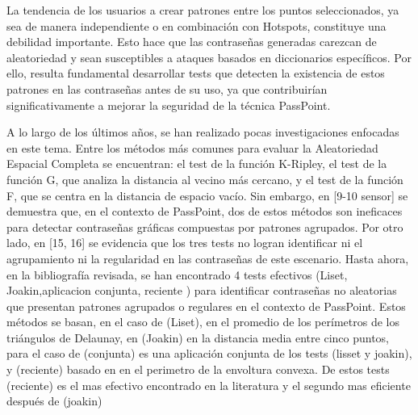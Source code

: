 \documentclass[12pt]{report}
\begin{document}
	La tendencia de los usuarios a crear patrones entre los puntos seleccionados, ya sea de manera independiente o en combinación con Hotspots, constituye una debilidad importante. Esto hace que las contraseñas generadas carezcan de aleatoriedad y sean susceptibles a ataques basados en diccionarios específicos. Por ello, resulta fundamental desarrollar tests que detecten la existencia de estos patrones en las contraseñas antes de su uso, ya que contribuirían significativamente a mejorar la seguridad de la técnica PassPoint.
	
	

	A lo largo de los últimos años, se han realizado pocas investigaciones enfocadas en este tema. Entre los métodos más comunes para evaluar la Aleatoriedad Espacial Completa se encuentran: el test de la función K-Ripley, el test de la función G, que analiza la distancia al vecino más cercano, y el test de la función F, que se centra en la distancia de espacio vacío. Sin embargo, en [9-10 sensor] se demuestra que, en el contexto de PassPoint, dos de estos métodos son ineficaces para detectar contraseñas gráficas compuestas por patrones agrupados. Por otro lado, en [15, 16] se evidencia que los tres tests no logran identificar ni el agrupamiento ni la regularidad en las contraseñas de este escenario. Hasta ahora, en la bibliografía revisada, se han encontrado 4 tests efectivos (Liset, Joakin,aplicacion conjunta, reciente ) para identificar contraseñas no aleatorias que presentan patrones agrupados o regulares en el contexto de PassPoint. Estos métodos se basan, en el caso de (Liset), en el promedio de los perímetros de los triángulos de Delaunay, en  (Joakin) en la distancia media entre cinco puntos, para el caso de (conjunta) es una aplicación conjunta de los tests (lisset y joakin), y (reciente) basado en en el perimetro de la envoltura convexa. De estos tests (reciente) es el mas efectivo encontrado en la literatura y el segundo mas eficiente después de (joakin)
	
\end{document}
